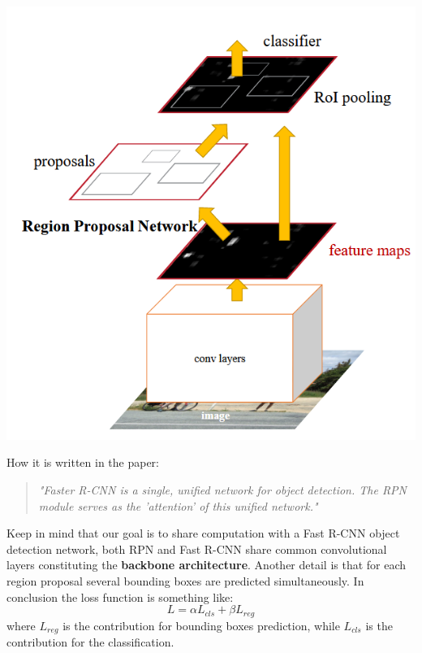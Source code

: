 \begin{multicols}{2}
    \begin{center}
        \includegraphics[scale=0.5]{img/FasterRCNN-.png}
    \end{center}
    \noindent
How it is written in the paper: \begin{quotation}
    \noindent
    \emph{"Faster R-CNN is a single, unified network for object detection. The RPN module serves as the 'attention' of this unified network." 
    }
\end{quotation}
Keep in mind that our goal is to share computation with a Fast R-CNN object detection network, both RPN and Fast R-CNN share common convolutional layers constituting the \textbf{backbone architecture}. Another detail is that for each region proposal several bounding boxes are predicted simultaneously. In conclusion the loss function is something like:
\begin{equation}
    L = \alpha{L_{cls}} + \beta {L_{reg}}
\end{equation}
where $L_{reg}$ is the contribution for bounding boxes prediction, while $L_{cls}$ is the contribution for the classification. 
\end{multicols}


